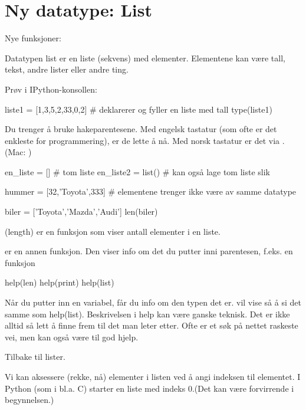 \section{Ny datatype: List}

\begin{usnintro}
Nye funksjoner: 
\end{usnintro}

Datatypen list er en liste (sekvens) med elementer. Elementene kan være tall, tekst, andre lister eller andre ting.

Prøv i IPython-konsollen:
\begin{usncodebox}
liste1 = [1,3,5,2,33,0,2]  # deklarerer og fyller en liste med tall
type(liste1)
\end{usncodebox}

\begin{usncomment}
Du trenger å bruke hakeparentesene. Med engelsk tastatur (som ofte er det enkleste for programmering), er de lette å nå. Med norsk tastatur er det via . (Mac: )
\end{usncomment}

\begin{usncodebox}
en_liste = []        # tom liste
en_liste2 = list()   # kan også lage tom liste slik

hummer = [32,'Toyota',333]   # elementene trenger ikke være av samme datatype

biler = ['Toyota','Mazda','Audi'] 
len(biler) 
\end{usncodebox}

 (length) er en funksjon som viser antall elementer i en liste. 

 er en annen funksjon. Den viser info om det du putter inni parentesen, f.eks. en funksjon

\begin{usncodebox}
help(len)
help(print)
help(list)
\end{usncodebox}

Når du putter inn en variabel, får du info om den typen det er. 
 vil vise så å si det samme som help(list). Beskrivelsen i help kan være ganske teknisk. Det er ikke alltid så lett å finne frem til det man leter etter. Ofte er et søk på nettet raskeste vei, men  kan også være til god hjelp. 

Tilbake til lister.

Vi kan aksessere (rekke, nå) elementer i listen ved å angi indeksen til elementet. I Python (som i bl.a. C) starter en liste med indeks 0.(Det kan være forvirrende i begynnelsen.) 


